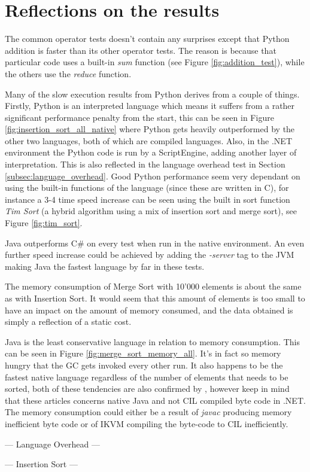 \section{Reflections on the results}

The common operator tests doesn't contain any surprises except that Python addition is faster than its other operator tests. The reason is because that particular code uses a built-in \textit{sum} function (see Figure \ref{fig:addition_test}), while the others use the \textit{reduce} function.

Many of the slow execution results from Python derives from a couple of things. Firstly, Python is an interpreted language which means it suffers from a rather significant performance penalty from the start, this can be seen in Figure \ref{fig:insertion_sort_all_native} where Python gets heavily outperformed by the other two languages, both of which are compiled languages. Also, in the .NET environment the Python code is run by a ScriptEngine, adding another layer of interpretation. This is also reflected in the language overhead test in Section \ref{subsec:language_overhead}. Good Python performance seem very dependant on using the built-in functions of the language (since these are written in C), for instance a 3-4 time speed increase can be seen using the built in sort function \textit{Tim Sort} (a hybrid algorithm using a mix of insertion sort and merge sort), see Figure \ref{fig:tim_sort}.

Java outperforms C\# on every test when run in the native environment. An even further speed increase could be achieved by adding the \textit{-server} tag to the JVM making Java the fastest language by far in these tests.

The memory consumption of Merge Sort with 10'000 elements is about the same as with Insertion Sort. It would seem that this amount of elements is too small to have an impact on the amount of memory consumed, and the data obtained is simply a reflection of a static cost.

Java is the least conservative language in relation to memory consumption. This can be seen in Figure \ref{fig:merge_sort_memory_all}. It's in fact so memory hungry that the GC gets invoked every other run. It also happens to be the fastest native language regardless of the number of elements that needs to be sorted, both of these tendencies are also confirmed by \cite{Benchmark} \cite{Benchmark2}, however keep in mind that these articles concerns native Java and not CIL compiled byte code in .NET. The memory consumption could either be a result of \textit{javac} producing memory inefficient byte code or of IKVM compiling the byte-code to CIL inefficiently.




--- Language Overhead ---



--- Insertion Sort ---


